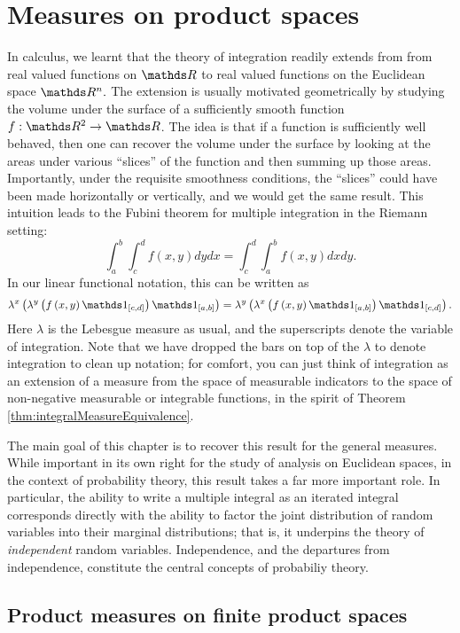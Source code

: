 
\chapter{Measures on product spaces\label{chap:productMeasures}}

In calculus, we learnt that the theory of integration readily extends
from from real valued functions on $\R$ to real valued functions
on the Euclidean space $\R^{n}.$ The extension is usually motivated
geometrically by studying the volume under the surface of a sufficiently
smooth function $f:\R^{2}\to\R$. The idea is that if a function is
sufficiently well behaved, then one can recover the volume under the
surface by looking at the areas under various ``slices'' of the function
and then summing up those areas. Importantly, under the requisite
smoothness conditions, the ``slices'' could have been made horizontally
or vertically, and we would get the same result. This intuition leads
to the Fubini theorem for multiple integration in the Riemann setting:
\[
\int_{a}^{b}\int_{c}^{d}f(x,y)dydx=\int_{c}^{d}\int_{a}^{b}f(x,y)dxdy.
\]
In our linear functional notation, this can be written as
\[
\lambda^{x}\left(\lambda^{y}\left(f\left(x,y\right)\indicate_{\left[c,d\right]}\right)\indicate_{\left[a,b\right]}\right)=\lambda^{y}\left(\lambda^{x}\left(f\left(x,y\right)\indicate_{\left[a,b\right]}\right)\indicate_{\left[c,d\right]}\right).
\]
Here $\lambda$ is the Lebesgue measure as usual, and the superscripts
denote the variable of integration. Note that we have dropped the
bars on top of the $\lambda$ to denote integration to clean up notation;
for comfort, you can just think of integration as an extension of
a measure from the space of measurable indicators to the space of
non-negative measurable or integrable functions, in the spirit of
Theorem \ref{thm:integralMeasureEquivalence}.

The main goal of this chapter is to recover this result for the general
measures. While important in its own right for the study of analysis
on Euclidean spaces, in the context of probability theory, this result
takes a far more important role. In particular, the ability to write
a multiple integral as an iterated integral corresponds directly with
the ability to factor the joint distribution of random variables into
their marginal distributions; that is, it underpins the theory of
\emph{independent }random variables. Independence, and the departures
from independence, constitute the central concepts of probabiliy theory.

\section{Product measures on finite product spaces}

